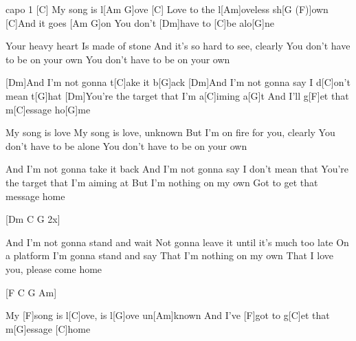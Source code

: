 
capo 1
[C] My song is l[Am G]ove
[C] Love to the l[Am]oveless sh[G (F)]own
[C]And it goes [Am G]on
You don't [Dm]have to [C]be alo[G]ne


Your heavy heart
Is made of stone
And it's so hard to see, clearly
You don't have to be on your own
You don't have to be on your own


[Dm]And I'm not gonna t[C]ake it b[G]ack
[Dm]And I'm not gonna say I d[C]on't mean t[G]hat
[Dm]You're the target that I'm a[C]iming a[G]t
And I'll g[F]et that m[C]essage ho[G]me


My song is love
My song is love, unknown
But I'm on fire for you, clearly
You don't have to be alone
You don't have to be on your own


And I'm not gonna take it back
And I'm not gonna say I don't mean that
You're the target that I'm aiming at
But I'm nothing on my own
Got to get that message home


[Dm C G 2x]


And I'm not gonna stand and wait
Not gonna leave it until it's much too late
On a platform I'm gonna stand and say
That I'm nothing on my own
That I love you, please come home


[F C G Am]


My [F]song is l[C]ove, is l[G]ove un[Am]known
And I've [F]got to g[C]et that m[G]essage [C]home
